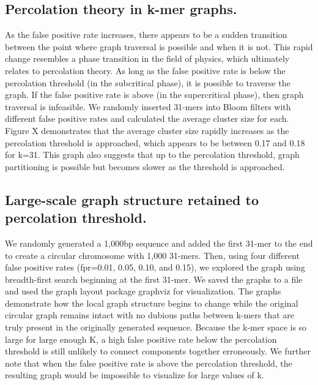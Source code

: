 \documentclass[12pt]{article} \usepackage{simplemargins}
\begin{document}
\subsection{Percolation theory in k-mer graphs.}
As the false positive rate increases, there appears to be a sudden
transition between the point where graph traversal is possible and
when it is not. This rapid change resembles a phase transition in the
field of physics, which ultimately relates to percolation theory. As
long as the false positive rate is below the percolation threshold (in
the subcritical phase), it is possible to traverse the graph. If the
false positive rate is above (in the supercritical phase), then graph
traversal is infeasible. We randomly inserted 31-mers into Bloom
filters with different false positive rates and calculated the average
cluster size for each. Figure X demonstrates that the average cluster
size rapidly increases as the percolation threshold is approached,
which appears to be between 0.17 and 0.18 for k=31. This graph also
suggests that up to the percolation threshold, graph partitioning is
possible but becomes slower as the threshold is approached.

\subsection{Large-scale graph structure retained to percolation threshold.} We
randomly generated a 1,000bp sequence and added the first 31-mer to
the end to create a circular chromosome with 1,000 31-mers. Then,
using four different false positive rates (fpr=0.01, 0.05, 0.10, and
0.15), we explored the graph using breadth-first search beginning at
the first 31-mer. We saved the graphs to a file and used the graph
layout package graphviz for visualization. The graphs demonstrate how
the local graph structure begins to change while the original circular
graph remains intact with no dubious paths between k-mers that are
truly present in the originally generated sequence. Because the k-mer
space is so large for large enough K, a high false positive rate below
the percolation threshold is still unlikely to connect components
together erroneously. We further note that when the false positive
rate is above the percolation threshold, the resulting graph would be
impossible to visualize for large values of k.
\end{document}
